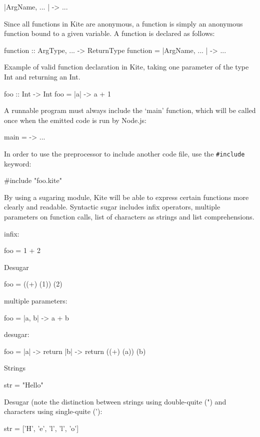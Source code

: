 \begin{kite}
  
|ArgName, ... | -> { ... }
\end{kite}
Since all functions in Kite are anonymous, a function is simply an anonymous function bound to a given variable. A function is declared
as follows:
\begin{kite}
  
  function :: ArgType, ... -> ReturnType
  function = |ArgName, ... | -> { ... }
\end{kite}
Example of valid function declaration in Kite, taking one parameter of
the type Int and returning an Int.
\begin{kite}
  
  foo :: Int -> Int
  foo = |a| -> {
    a + 1
  }
\end{kite}
A runnable program must always include the `main' function, which will be called once when the emitted code is run by Node.js:
\begin{kite}
  
  main = -> { ... }
\end{kite}
In order to use the preprocessor to include another code file, use the \texttt{\#include} keyword:
\begin{kite}
  
  #include "foo.kite"
\end{kite}

By using a sugaring module, Kite will be able to express certain
functions more clearly and readable. Syntactic sugar includes infix
operators, multiple parameters on function calls, list of characters
as strings and list comprehensions.

infix:
\begin{kite}
  
  foo = 1 + 2
\end{kite}

Desugar

\begin{kite}

  foo = ((+) (1)) (2)
\end{kite}

multiple parameters:
\begin{kite}
  
  foo = |a, b| -> {
    a + b
  }
\end{kite}
desugar:

\begin{kite}

  foo = |a| -> {
    return |b| -> {
      return ((+) (a)) (b)
    }
  }
\end{kite}
Strings 
\begin{kite}
  
  str = "Hello"
\end{kite}
Desugar (note the distinction between strings using double-quite (") and characters using single-quite ('):
\begin{kite}
  
  str = ['H', 'e', 'l', 'l', 'o']
\end{kite}

